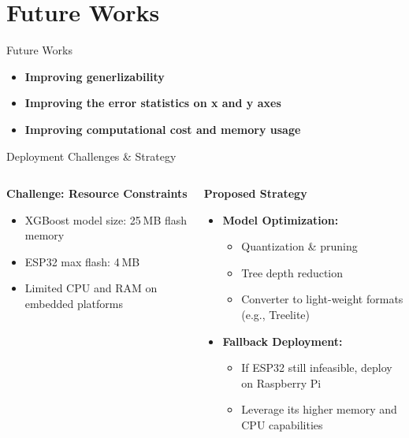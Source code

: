 \documentclass[aspectratio=169,xcolor=dvipsnames]{beamer}
\begin{document}
\section{Future Works}
\begin{frame}{Future Works}
  \begin{itemize}
    \item \textbf{Improving generlizability}
    \item \textbf{Improving the error statistics on x and y axes}
    \item \textbf{Improving computational cost and memory usage}
  \end{itemize}
\end{frame}

\begin{frame}{Deployment Challenges \& Strategy}
\begin{columns}[T]
  \begin{column}{0.48\textwidth}
    \begin{block}{{\textbf{Challenge: Resource Constraints}}}
      \begin{itemize}
        \item XGBoost model size: 25 MB flash memory  
        \item ESP32 max flash: 4 MB  
        \item Limited CPU and RAM on embedded platforms  
      \end{itemize}
    \end{block}
  \end{column}
  
  \begin{column}{0.48\textwidth}
    \begin{exampleblock}{{\textbf{Proposed Strategy}}}
      \begin{itemize}
        \item \textbf{Model Optimization:}  
          \begin{itemize}
            \item Quantization \& pruning  
            \item Tree depth reduction  
            \item Converter to light-weight formats (e.g., Treelite)
          \end{itemize}
        \item \textbf{Fallback Deployment:}  
          \begin{itemize}
            \item If ESP32 still infeasible, deploy on Raspberry Pi  
            \item Leverage its higher memory and CPU capabilities  
          \end{itemize}
      \end{itemize}
    \end{exampleblock}
  \end{column}
\end{columns}
\end{frame} 
\end{document}
